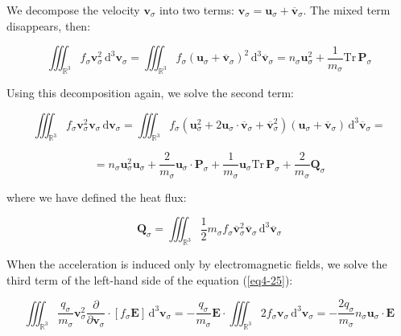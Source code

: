 We decompose the velocity $\mathbf{v}_\sigma$ into two terms: $\mathbf{v}_\sigma=\mathbf{u}_\sigma+\overline{\mathbf{v}}_\sigma$. The mixed term disappears, then:

\begin{equation}
    \iiint_{\mathbb{R}^3}f_\sigma\mathbf{v}_\sigma^2\,\mathrm{d}^3\mathbf{v}_\sigma=\iiint_{\mathbb{R}^3}f_\sigma\left(\mathbf{u}_\sigma+\overline{\mathbf{v}}_\sigma\right)^2\,\mathrm{d}^3\overline{\mathbf{v}}_\sigma=n_\sigma\mathbf{u}_\sigma^2+\frac{1}{m_\sigma}\mathrm{Tr}\,\mathbf{P}_\sigma
\end{equation}

Using this decomposition again, we solve the second term:

\begin{equation*}
    \iiint_{\mathbb{R}^3}f_\sigma\mathbf{v}_\sigma^2\mathbf{v}_\sigma\,\mathrm{d}\mathbf{v}_\sigma=\iiint_{\mathbb{R}^3}f_\sigma\left(\mathbf{u}_\sigma^2+2\mathbf{u}_\sigma\cdot\overline{\mathbf{v}}_\sigma+\overline{\mathbf{v}}_\sigma^2\right)\left(\mathbf{u}_\sigma+\overline{\mathbf{v}}_\sigma\right)\,\mathrm{d}^3\overline{\mathbf{v}}_\sigma=
\end{equation*}

\begin{equation}
    =n_\sigma\mathbf{u}_\sigma^2\mathbf{u}_\sigma+\frac{2}{m_\sigma}\mathbf{u}_\sigma\cdot\mathbf{P}_\sigma+\frac{1}{m_\sigma}\mathbf{u}_\sigma\mathrm{Tr}\,\mathbf{P}_\sigma+\frac{2}{m_\sigma}\mathbf{Q}_\sigma
\end{equation}

where we have defined the heat flux:

\begin{equation}
    \mathbf{Q}_\sigma=\iiint_{\mathbb{R}^3}\frac{1}{2}m_\sigma f_\sigma\overline{\mathbf{v}}_\sigma^2\overline{\mathbf{v}}_\sigma\,\mathrm{d}^3\overline{\mathbf{v}}_\sigma
\end{equation}

When the acceleration is induced only by electromagnetic fields, we solve the third term of the left-hand side of the equation (\ref{eq4-25}):

\begin{equation}
    \iiint_{\mathbb{R}^3}\frac{q_\sigma}{m_\sigma}\mathbf{v}_\sigma^2\frac{\partial}{\partial\mathbf{v}_\sigma}\cdot\left[f_\sigma\mathbf{E}\right]\,\mathrm{d}^3\mathbf{v}_\sigma=-\frac{q_\sigma}{m_\sigma}\mathbf{E}\cdot\iiint_{\mathbb{R}^3}2f_\sigma\mathbf{v}_\sigma\,\mathrm{d}^3\mathbf{v}_\sigma=-\frac{2q_\sigma}{m_\sigma}n_\sigma\mathbf{u}_\sigma\cdot\mathbf{E}
\end{equation}

